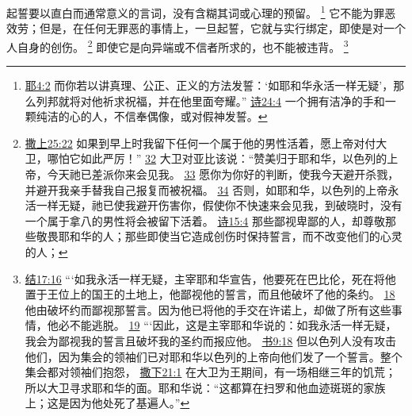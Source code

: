 \documentclass[12pt, a4paper, oneside]{ctexart}
\newcounter{parnum}[section]
\newcommand{\N}{%
   \noindent\refstepcounter{parnum}%
    \makebox[\parindent][l]{\textbf{\arabic{parnum}.}}}
\begin{document}
\N 起誓要以直白而通常意义的言词，没有含糊其词或心理的预留。
	\footnote {
		\href{https://biblehub.com/jeremiah/4-2.htm}{耶4:2} 而你若以讲真理、公正、正义的方法发誓：‘如耶和华永活一样无疑’，那么列邦就将对他祈求祝福，并在他里面夸耀。”
		\href{https://biblehub.com/psalms/24-4.htm}{诗24:4} 一个拥有洁净的手和一颗纯洁的心的人，不信奉偶像，或对假神发誓。
	}
	它不能为罪恶效劳；但是，在任何无罪恶的事情上，一旦起誓，它就与实行绑定，即使是对一个人自身的创伤。
	\footnote {
		\href{https://biblehub.com/1_samuel/25-22.htm}{撒上25:22} 如果到早上时我留下任何一个属于他的男性活着，愿上帝对付大卫，哪怕它如此严厉！”
		\href{https://biblehub.com/1_samuel/25-32.htm}{32} 大卫对亚比该说：“赞美归于耶和华，以色列的上帝，今天祂已差派你来会见我。
		\href{https://biblehub.com/1_samuel/25-33.htm}{33} 愿你为你好的判断，使我今天避开杀戮，并避开我亲手替我自己报复而被祝福。
		\href{https://biblehub.com/1_samuel/25-34.htm}{34} 否则，如耶和华，以色列的上帝永活一样无疑，祂已使我避开伤害你，假使你不快速来会见我，到破晓时，没有一个属于拿八的男性将会被留下活着。
		\href{https://biblehub.com/psalms/15-4.htm}{诗15:4} 那些鄙视卑鄙的人，却尊敬那些敬畏耶和华的人；那些即使当它造成创伤时保持誓言，而不改变他们的心灵的人；
	}
	即使它是向异端或不信者所求的，也不能被违背。
	\footnote {
		\href{https://biblehub.com/ezekiel/17-16.htm}{结17:16} “‘如我永活一样无疑，主宰耶和华宣告，他要死在巴比伦，死在将他置于王位上的国王的土地上，他鄙视他的誓言，而且他破坏了他的条约。
		\href{https://biblehub.com/ezekiel/17-18.htm}{18} 他由破坏约而鄙视那誓言。因为他已将他的手交在许诺上，却做了所有这些事情，他必不能逃脱。
		\href{https://biblehub.com/ezekiel/17-19.htm}{19} “‘因此，这是主宰耶和华说的：如我永活一样无疑，我会为鄙视我的誓言且破坏我的圣约而报应他。
		\href{https://biblehub.com/joshua/9-18.htm}{书9:18} 但以色列人没有攻击他们，因为集会的领袖们已对耶和华以色列的上帝向他们发了一个誓言。整个集会都对领袖们抱怨，
		\href{https://biblehub.com/2_samuel/21-1.htm}{撒下21:1} 在大卫为王期间，有一场相继三年的饥荒；所以大卫寻求耶和华的面。耶和华说：“这都算在扫罗和他血迹斑斑的家族上；这是因为他处死了基遍人。”
	}
\end{document}
